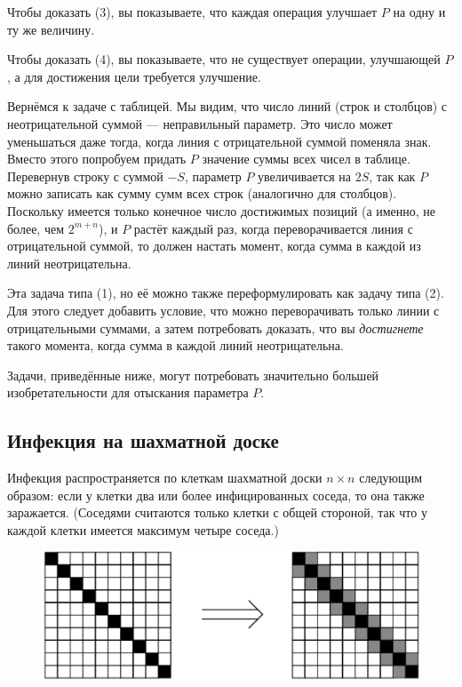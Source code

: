 Чтобы доказать (3), вы показываете, что каждая операция улучшает $P$ на одну и ту же величину.

Чтобы доказать (4), вы показываете, что не существует операции, улучшающей $P$, а для достижения цели требуется улучшение.

\medskip

Вернёмся к задаче с таблицей.
Мы видим, что число линий (строк и столбцов) с неотрицательной суммой --- неправильный параметр.
Это число может уменьшаться даже тогда, когда линия с отрицательной суммой поменяла знак.
Вместо этого попробуем придать $P$ значение суммы всех чисел в таблице.
Перевернув строку с суммой $-S$, параметр $P$ увеличивается на $2S$, так как $P$ можно записать как сумму сумм всех строк (аналогично для столбцов).
Поскольку имеется только конечное число достижимых позиций
(а именно, не более, чем $2^{m+n}$), и $P$ растёт каждый раз, когда переворачивается линия с отрицательной суммой, то должен настать момент, когда сумма в каждой из линий неотрицательна.

Эта задача типа (1), но её можно также переформулировать как задачу типа (2).
Для этого следует добавить условие, что можно переворачивать только линии с отрицательными суммами, а затем потребовать доказать, что вы \emph{достигнете} такого момента, когда сумма в каждой линий неотрицательна.

\medskip

Задачи, приведённые ниже, могут потребовать значительно большей изобретательности для отыскания параметра $P$.

\subsection*{Инфекция на шахматной доске}%

Инфекция распространяется по клеткам шахматной доски $n \times n$ следующим образом: если у клетки два или более инфицированных соседа, то она также заражается.
(Соседями считаются только клетки с общей стороной, так что у каждой клетки имеется максимум четыре соседа.)

\begin{figure}[h!]
\centering
\includegraphics[scale=0.6]{Figs/Algorithms/diag}
\end{figure}

